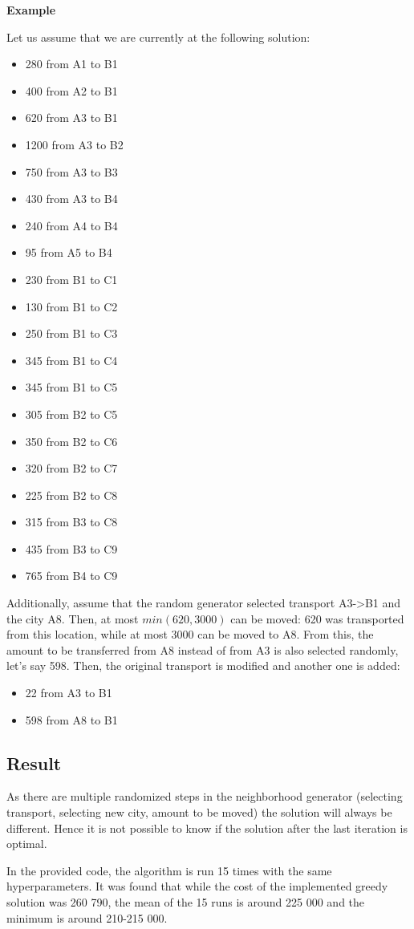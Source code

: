 \documentclass{article}
\begin{document}
\textbf{Example}

Let us assume that we are currently at the following solution:
\begin{itemize}
    \item 280 from A1 to B1
    \item 400 from A2 to B1
    \item 620 from A3 to B1
    \item 1200 from A3 to B2
    \item 750 from A3 to B3
    \item 430 from A3 to B4
    \item 240 from A4 to B4
    \item 95 from A5 to B4
    \item 230 from B1 to C1
    \item 130 from B1 to C2
    \item 250 from B1 to C3
    \item 345 from B1 to C4
    \item 345 from B1 to C5
    \item 305 from B2 to C5
    \item 350 from B2 to C6
    \item 320 from B2 to C7
    \item 225 from B2 to C8
    \item 315 from B3 to C8
    \item 435 from B3 to C9
    \item 765 from B4 to C9
\end{itemize}
Additionally, assume that the random generator selected transport A3-\textgreater B1 and the city A8.
Then, at most $min(620,3000)$ can be moved: 620 was transported from this location, while at most 3000 can be moved to A8.
From this, the amount to be transferred from A8 instead of from A3 is also selected randomly, let's say 598.
Then, the original transport is modified and another one is added:
\begin{itemize}
    \item 22 from A3 to B1
    \item 598 from A8 to B1
\end{itemize}

\subsection{Result}
As there are multiple randomized steps in the neighborhood generator (selecting transport, selecting new city, amount to be moved) the solution will always be different.
Hence it is not possible to know if the solution after the last iteration is optimal.

In the provided code, the algorithm is run 15 times with the same hyperparameters.
It was found that while the cost of the implemented greedy solution was 260 790, the mean of the 15 runs is around 225 000 and the minimum is around 210-215 000.
\end{document}
